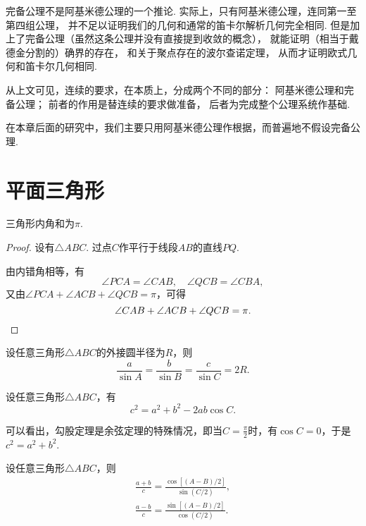 完备公理不是阿基米德公理的一个推论.
实际上，只有阿基米德公理，连同第一至第四组公理，
并不足以证明我们的几何和通常的笛卡尔解析几何完全相同.
但是加上了完备公理（虽然这条公理并没有直接提到收敛的概念），
就能证明（相当于戴德金分割的）确界的存在，
和关于聚点存在的波尔查诺定理，
从而才证明欧式几何和笛卡尔几何相同.

从上文可见，连续的要求，在本质上，分成两个不同的部分：
阿基米德公理和完备公理；
前者的作用是替连续的要求做准备，
后者为完成整个公理系统作基础.

在本章后面的研究中，我们主要只用阿基米德公理作根据，而普遍地不假设完备公理.

\section{平面三角形}

\begin{theorem}
三角形内角和为\(\pi\).
\begin{proof}
设有\(\triangle ABC\).
过点\(C\)作平行于线段\(AB\)的直线\(PQ\).

由内错角相等，有\[
\angle{PCA} = \angle{CAB}, \quad \angle{QCB} = \angle{CBA},
\]又由\(\angle{PCA}+\angle{ACB}+\angle{QCB}=\pi\)，可得\[
\angle{CAB}+\angle{ACB}+\angle{QCB}=\pi.
\qedhere
\]
\end{proof}
\end{theorem}

\begin{theorem}[正弦定理]
设任意三角形\(\triangle ABC\)的外接圆半径为\(R\)，则\begin{equation}
\frac{a}{\sin A}
= \frac{b}{\sin B}
= \frac{c}{\sin C}
= 2R.
\end{equation}
\end{theorem}

\begin{theorem}[余弦定理]
设任意三角形\(\triangle ABC\)，有\begin{equation}
c^2 = a^2 + b^2 - 2ab \cos C.
\end{equation}
\end{theorem}
可以看出，勾股定理是余弦定理的特殊情况，即当\(C = \frac{\pi}{2}\)时，有\(\cos C=0\)，于是\(c^2 = a^2 + b^2\).

\begin{theorem}[摩尔外德公式]
设任意三角形\(\triangle ABC\)，则\begin{gather}
\frac{a+b}{c}
= \frac{\cos[(A-B)/2]}{\sin(C/2)}, \\
\frac{a-b}{c}
= \frac{\sin[(A-B)/2]}{\cos(C/2)}.
\end{gather}
\end{theorem}

